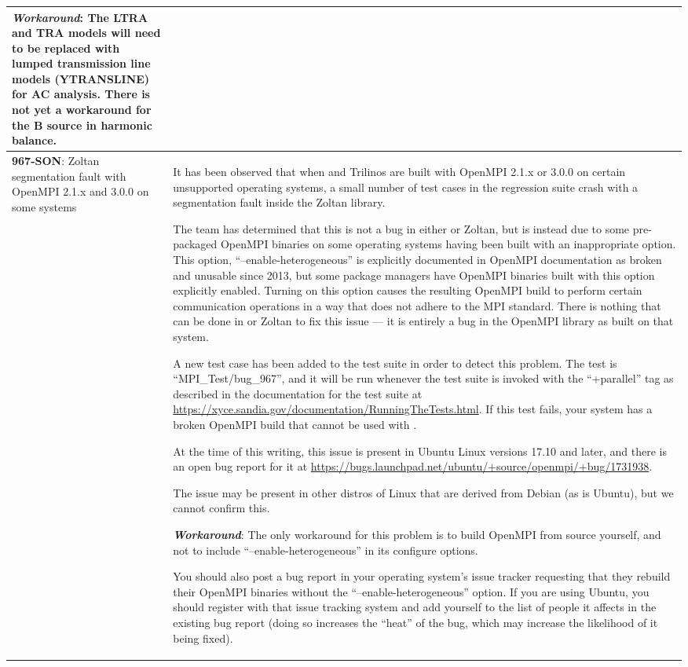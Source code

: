 {\begin{longtable}[h] {>{\raggedright\small}m{2in}|>{\raggedright\let\\\tabularnewline\small}m{3.5in}}
\textbf{\textit{Workaround}}: The LTRA and TRA models will need to be replaced
with lumped transmission line models (YTRANSLINE) for AC analysis.
There is not yet a workaround for the B source in harmonic balance.
\\ \hline

\textbf{967-SON}: Zoltan segmentation fault with OpenMPI 2.1.x and 3.0.0 on
some systems &

It has been observed that when \Xyce{} and Trilinos are built with
OpenMPI 2.1.x or 3.0.0 on certain unsupported operating systems, a
small number of test cases in the regression suite crash with a
segmentation fault inside the Zoltan library.

The \Xyce{} team has determined that this is not a bug in
either \Xyce{} or Zoltan, but is instead due to some pre-packaged OpenMPI
binaries on some operating systems having been built with an
inappropriate option.  This option, ``--enable-heterogeneous'' is
explicitly documented in OpenMPI documentation as broken and unusable
since 2013, but some package managers have OpenMPI binaries built with
this option explicitly enabled.  Turning on this option causes the
resulting OpenMPI build to perform certain communication operations in
a way that does not adhere to the MPI standard.  There is nothing that
can be done in \Xyce{} or Zoltan to fix this issue --- it is entirely
a bug in the OpenMPI library as built on that system.

A new test case has been added to the \Xyce{} test suite in order to
detect this problem.  The test is ``MPI\_Test/bug\_967'', and it will
be run whenever the test suite is invoked with the ``+parallel'' tag
as described in the documentation for the test suite
at \url{https://xyce.sandia.gov/documentation/RunningTheTests.html}.
If this test fails, your system has a broken OpenMPI build that cannot
be used with \Xyce{}.

At the time of this writing, this issue is present in Ubuntu Linux
versions 17.10 and later, and there is an open bug report for it
at \url{https://bugs.launchpad.net/ubuntu/+source/openmpi/+bug/1731938}.

The issue may be present in other distros of Linux that are derived
from Debian (as is Ubuntu), but we cannot confirm this.

\textbf{\textit{Workaround}}:
The only workaround for this problem is to build OpenMPI from source
yourself, and not to include ``--enable-heterogeneous'' in its
configure options.

You should also post a bug report in your operating system's issue
tracker requesting that they rebuild their OpenMPI binaries without
the ``--enable-heterogeneous'' option.  If you are using Ubuntu, you
should register with that issue tracking system and add yourself to
the list of people it affects in the existing bug report (doing so
increases the ``heat'' of the bug, which may increase the likelihood
of it being fixed).


\end{longtable}}
